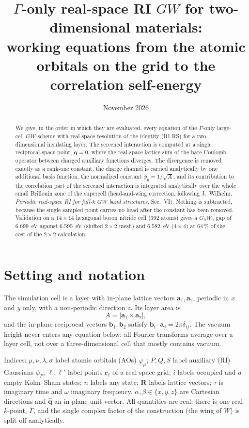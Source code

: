 \documentclass[11pt,a4paper]{article}
\title{$\Gamma$-only real-space RI $GW$ for two-dimensional materials:\\
working equations from the atomic orbitals on the grid to the correlation self-energy}
\author{}
\date{November 2026}
\newcommand{\br}{\mathbf{r}}
\newcommand{\bR}{\mathbf{R}}
\newcommand{\bq}{\mathbf{q}}
\newcommand{\qhat}{\hat{\mathbf{q}}}
\begin{document}
\maketitle

\begin{abstract}
\noindent We give, in the order in which they are evaluated, every equation of the $\Gamma$-only
large-cell $GW$ scheme with real-space resolution of the identity (RI-RS) for a two-dimensional
insulating layer. The screened interaction is computed at a single reciprocal-space point,
$\bq = 0$, where the real-space lattice sum of the bare Coulomb operator between charged
auxiliary functions diverges. The divergence is removed exactly as a rank-one constant, the
charge channel is carried analytically by one additional basis function, the normalized constant
$\phi_0 = 1/\sqrt{A}$, and its contribution to the correlation part of the screened interaction
is integrated analytically over the whole small Brillouin zone of the supercell (head-and-wing
correction, following J.~Wilhelm, \emph{Periodic real-space RI for full-$k$ $GW$ band
structures}, Sec.~VI). Nothing is subtracted, because the single sampled point carries no head
after the constant has been removed. Validation on a $14\times14$ hexagonal boron nitride cell
(392 atoms) gives a $G_0W_0$ gap of 6.699~eV against 6.595~eV (shifted $2\times2$ mesh) and
6.582~eV ($4\times4$) at 64\,\% of the cost of the $2\times2$ calculation.
\end{abstract}

\section{Setting and notation}

The simulation cell is a layer with in-plane lattice vectors $\mathbf a_1,\mathbf a_2$,
periodic in $x$ and $y$ only, with a non-periodic direction $z$. Its layer area is
\begin{equation}
  A = |\mathbf a_1\times\mathbf a_2| ,
\end{equation}
and the in-plane reciprocal vectors $\mathbf b_1,\mathbf b_2$ satisfy
$\mathbf b_i\cdot\mathbf a_j = 2\pi\delta_{ij}$. The vacuum height never enters any equation
below: all Fourier transforms average over a layer cell, not over a three-dimensional cell that
mostly contains vacuum.

Indices: $\mu,\nu,\lambda,\sigma$ label atomic orbitals (AOs) $\varphi_\mu$; $P,Q,S$ label
auxiliary (RI) Gaussians $\phi_P$; $\ell,\ell'$ label points $\br_\ell$ of a real-space grid;
$i$ labels occupied and $a$ empty Kohn--Sham states; $n$ labels any state; $\bR$ labels lattice
vectors; $\tau$ is imaginary time and $\omega$ imaginary frequency. $\alpha,\beta\in\{x,y,z\}$
are Cartesian directions and $\qhat$ an in-plane unit vector. All quantities are real: there is
one real $k$-point, $\Gamma$, and the single complex factor of the construction (the wing of $W$)
is split off analytically.
\end{document}

